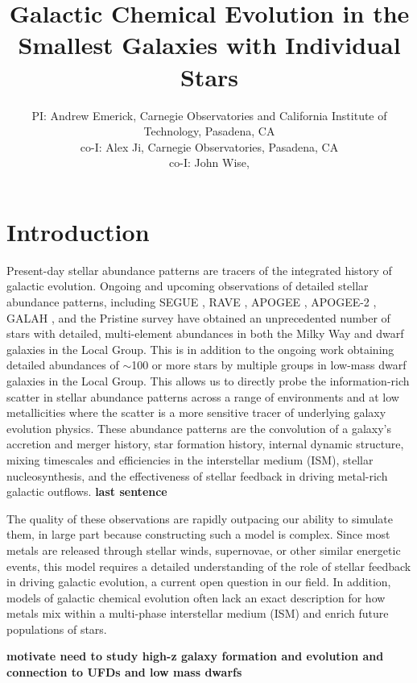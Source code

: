 \documentclass[12pt]{article} %
\title{\vspace{-5ex} \Large Galactic Chemical Evolution in the Smallest Galaxies with Individual Stars
       \vspace{-2ex}}
\author{\small PI: Andrew Emerick, Carnegie Observatories and California Institute of Technology, Pasadena, CA \\ 
\small co-I: Alex Ji, Carnegie Observatories, Pasadena, CA \\
\small co-I: John Wise,
}
\date{\vspace{-5ex}}
\begin{document}
 \thispagestyle{empty}


\maketitle

\section{Introduction}
Present-day stellar abundance patterns are tracers of the integrated history of galactic evolution. Ongoing and upcoming observations of detailed stellar abundance patterns, including SEGUE \citep{Yanny2009}, RAVE \citep{Kunder2017}, APOGEE \citep{Anders2014}, APOGEE-2 \citep{Majewski2016}, GALAH \citep{Buder2018}, and the Pristine survey \citep{Starkenburg2017} have obtained an unprecedented number of stars with detailed, multi-element abundances in both the Milky Way and dwarf galaxies in the Local Group. This is in addition to the ongoing work obtaining detailed abundances of $\sim$100 or more stars by multiple groups \cite[e.g.][ (need more!) ]{Hill2019} in low-mass dwarf galaxies in the Local Group. This allows us to directly probe the information-rich scatter in stellar abundance patterns across a range of environments and at low metallicities where the scatter is a more sensitive tracer of underlying galaxy evolution physics. These abundance patterns are the convolution of a galaxy's accretion and merger history, star formation history, internal dynamic structure, mixing timescales and efficiencies in the interstellar medium (ISM), stellar nucleosynthesis, and the effectiveness of stellar feedback in driving metal-rich galactic outflows. \textbf{last sentence}

The quality of these observations are rapidly outpacing our ability to simulate them, in large part because constructing such a model is complex.  Since most metals are released through stellar winds, supernovae, or other similar energetic events, this model requires a detailed understanding of the role of stellar feedback in driving galactic evolution, a current open question in our field.  In addition, models of galactic chemical evolution often lack an exact description for how metals mix within a multi-phase interstellar medium (ISM) and enrich future populations of stars. 

\textbf{motivate need to study high-z galaxy formation and evolution and connection to UFDs and low mass dwarfs}
\end{document}
